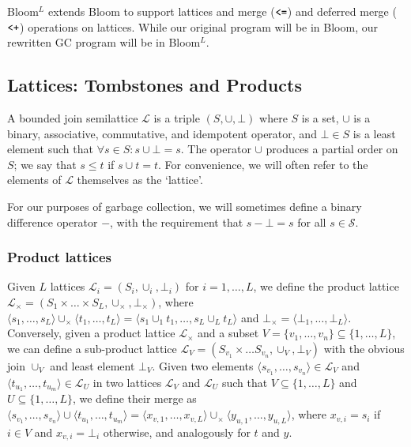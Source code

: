 Bloom$^L$ extends Bloom to support lattices and merge ($\tt{<=}$) and deferred merge ($\tt{<+}$) operations on lattices.
While our original program will be in Bloom, our rewritten GC program will be in  Bloom$^L$.


\subsection{Lattices: Tombstones and Products}
A bounded join semilattice $\mathcal{L}$ is a triple $(S, \cup, \bot)$ where $S$ is a set, $\cup$ is a binary, associative, commutative, and idempotent operator, and $\bot \in S$ is a least element such that $\forall s \in S: s \cup \bot = s$.
The operator $\cup$ produces a partial order on $S$; we say that $s \leq t$ if $s \cup t = t$.
For convenience, we will often refer to the elements of $\mathcal{L}$ themselves as the `lattice'.

For our purposes of garbage collection, we will sometimes define a binary difference operator $-$, with the requirement that $s - \bot = s$ for all $s \in \mathcal{S}$.


\subsubsection{Product lattices}
Given $L$ lattices $\mathcal{L}_i = (S_i, \cup_i, \bot_i)$ for $i = 1, \dots, L$, we define the product lattice $\mathcal{L}_\times = \left(S_1 \times \dots \times S_L, \cup_\times, \bot_\times\right)$, where $\langle s_1, \dots, s_L \rangle \cup_\times \langle t_1, \dots, t_L \rangle = \langle s_1 \cup_1 t_1, \dots, s_L \cup_L t_L \rangle$ and $\bot_\times = \langle \bot_1, \dots, \bot_L \rangle$.
Conversely, given a product lattice $\mathcal{L}_\times$ and a subset $V =\{v_1, \dots, v_n\} \subseteq \{1, \dots, L\}$, we can define a sub-product lattice $\mathcal{L}_V = (S_{v_1} \times \dots S_{v_n}, \cup_V, \bot_V)$ with the obvious join $\cup_V$ and least element $\bot_V$.
Given two elements $\langle s_{v_1}, \dots, s_{v_n}\rangle \in \mathcal{L}_V$ and $\langle t_{u_1}, \dots, t_{u_m}\rangle \in \mathcal{L}_U$ in two lattices $\mathcal{L}_V$ and $\mathcal{L}_U$ such that $V \subseteq \{1,\dots,L\}$ and $U \subseteq \{1,\dots,L\}$, we define their merge as
$\langle s_{v_1}, \dots, s_{v_n}\rangle \cup \langle t_{u_1}, \dots, t_{u_m}\rangle = \langle x_{v,1}, \dots, x_{v,L} \rangle \cup_\times \langle y_{u,1}, \dots, y_{u,L} \rangle$,
where $x_{v,i} = s_i$ if $i \in V$ and $x_{v,i} = \bot_i$ otherwise, and analogously for $t$ and $y$.

